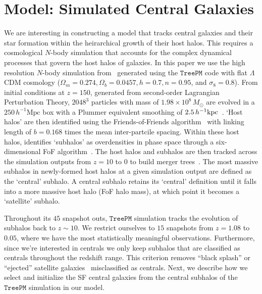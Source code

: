 \documentclass[12pt, letterpaper, preprint, tighten]{aastex62}
\newcommand{\edt}[1]{{\color{dred}{\bf} #1}}
\begin{document}
\section{Model: Simulated Central Galaxies} \label{sec:sim}
\edt{We are} interesting in constructing a model that tracks central galaxies and
their star formation within the heirarchical growth of their host halos. This
requires a cosmological $N$-body simulation that accounts for the complex
dynamical processes that govern the host halos of galaxies. In this paper
we use the high resolution $N$-body simulation from~\cite{wetzel2013} generated
using the \cite{white2002} $\mathtt{TreePM}$ code with flat $\Lambda$CDM cosmology
($\Omega_m =0.274, \Omega_b = 0.0457, h = 0.7, n=0.95$, and $\sigma_8 = 0.8$).
From initial conditions at $z = 150$, generated from second-order Lagrangian
Perturbation Theory, $2048^3$ particles with mass of $1.98 \times 10^8\,M_\odot$ are
evolved in a \edt{$250\,h^{-1}\mathrm{Mpc}$} box with a Plummer equivalent smoothing of
\edt{$2.5\,h^{-1}{\rm kpc}$}~\citep{wetzel2013, wetzel2014}. `Host halos' are then
identified using the Friends-of-Friends algorithm~\citep[FoF;][]{davis1985} with
linking length of $b{=}0.168$ times the mean inter-partcile spacing. Within
these host halos, \cite{wetzel2013} identifies `subhalos' as overdensities
in phase space through a six-dimensional FoF algorithm~\citep[FoF6D;][]{white2010}.
The host halos and subhalos are then tracked across the simulation outputs
from $z = 10$ to $0$ to build merger trees~\citep{wetzel2009,wetzel2010}.
The most massive subhalos in newly-formed host halos at a given simulation
output are defined as the `central' subhalo. A central subhalo retains its
`central' definition until it falls into a more massive host halo
\edt{(FoF halo mass)}, at which point it becomes a `satellite' subhalo.

Throughout its $45$ snapshot outs, $\mathtt{TreePM}$ simulation tracks
the evolution of subhalos back to $z \sim 10$. We restrict ourselves to $15$
snapshots from $z = 1.08$ to $0.05$, where we have the most statistically
meaningful observations. Furthermore, since we're interested in centrals we only
keep subhalos that are classified as centrals throughout the redshift
range. This criterion removes ``black splash'' or ``ejected'' satellite
galaxies~\citep[\emph{e.g.}][]{mamon2004,wetzel2014} misclassified as
centrals. Next, we describe how we select and initialize the SF central
galaxies from the central subhalos of the $\mathtt{TreePM}$
simulation in our model.
\end{document}
